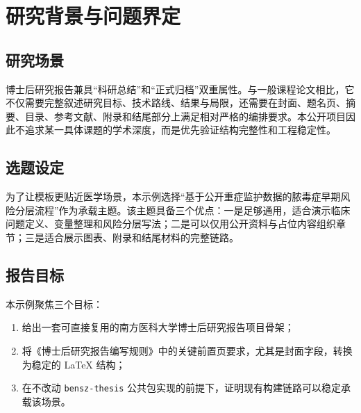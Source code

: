 \chapter{研究背景与问题界定}

\section{研究场景}

博士后研究报告兼具“科研总结”和“正式归档”双重属性。与一般课程论文相比，它不仅需要完整叙述研究目标、技术路线、结果与局限，还需要在封面、题名页、摘要、目录、参考文献、附录和结尾部分上满足相对严格的编排要求。本公开项目因此不追求某一具体课题的学术深度，而是优先验证结构完整性和工程稳定性。

\section{选题设定}

为了让模板更贴近医学场景，本示例选择“基于公开重症监护数据的脓毒症早期风险分层流程”作为承载主题。该主题具备三个优点：一是足够通用，适合演示临床问题定义、变量整理和风险分层写法；二是可以仅用公开资料与占位内容组织章节；三是适合展示图表、附录和结尾材料的完整链路。

\section{报告目标}

本示例聚焦三个目标：

\begin{enumerate}
  \item 给出一套可直接复用的南方医科大学博士后研究报告项目骨架；
  \item 将《博士后研究报告编写规则》中的关键前置页要求，尤其是封面字段，转换为稳定的 LaTeX 结构；
  \item 在不改动 \texttt{bensz-thesis} 公共包实现的前提下，证明现有构建链路可以稳定承载该场景。
\end{enumerate}
